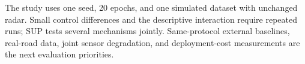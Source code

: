 The study uses one seed, 20 epochs, and one simulated dataset with unchanged radar. Small control differences and the descriptive interaction require repeated runs; SUP tests several mechanisms jointly. Same-protocol external baselines, real-road data, joint sensor degradation, and deployment-cost measurements are the next evaluation priorities.
